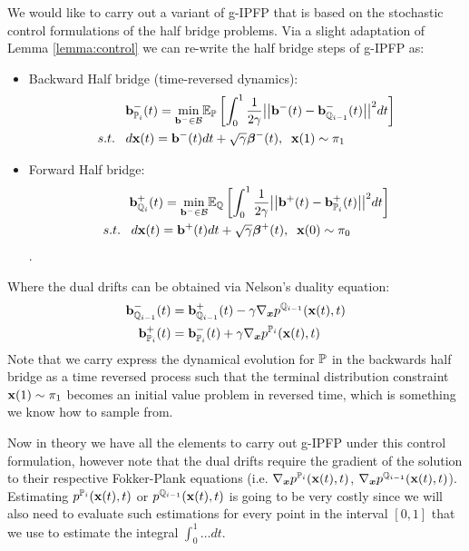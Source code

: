 \documentclass[a4paper,12pt,twoside,openright]{report}
\theoremstyle{definition}
\begin{document}
We would like to carry out a variant of g-IPFP that is based on the stochastic control formulations of the half bridge problems. Via a slight adaptation of Lemma \ref{lemma:control} we can re-write the half bridge steps of g-IPFP as:
\begin{itemize}
\item Backward Half bridge (time-reversed dynamics): 
\begin{align} \label{eq:controlled_haalf_bridge_forward}
  \rvb^{-}_{\P_{i}}(t) = \min_{\rvb^{-} \in \calB }  &\E_\P\left[\int_0^1 \frac{1}{2\gamma}\big|\big|\rvb^{-}(t) -\rvb^{-}_{\Q_{i-1}}(t) \big|\big|^2 dt\right] \nonumber \\
    s.t.\;\;\; d\rvx(t) = \rvb^{-}(t) &dt + \sqrt{\gamma} \rvw^{-}(t), \;\; \rvx(1) \sim \pi_1
\end{align}
\item Forward Half bridge:
\begin{align} \label{eq:controlled_half_bridge_backward}
   \rvb^{+}_{\Q_{i}}(t) =\min_{\rvb^{-} \in \calB } & \E_\Q\left[\int_0^1 \frac{1}{2\gamma}\big|\big|\rvb^{+}(t) -\rvb^{+}_{\P_{i}}(t)\big|\big|^2 dt\right] \nonumber \\
    s.t.\;\;\; d\rvx(t) = \rvb^{+}(t) &dt + \sqrt{\gamma} \rvw^{+}(t), \;\; \rvx(0) \sim \pi_0
\end{align}.
\end{itemize}
Where the dual drifts can be obtained via Nelson's duality equation:
\begin{align*}
      \rvb^{-}_{\Q_{i-1}}(t)   &=\rvb^{+}_{\Q_{i-1}}(t) -\gamma\nabla_{\vx} p^{\Q_{i-1}}(\rvx(t), t) \\
    \rvb^{+}_{\P_{i}}(t) &=  \rvb^{-}_{\P_{i}}(t) +\gamma\nabla_{\vx} p^{\P_{i}}(\rvx(t), t)
\end{align*}
Note that we carry express the dynamical evolution for $\P$ in the backwards half bridge as a time reversed process \citep{pavon1991free, nelson1967dynamical} such that the terminal distribution constraint $\rvx(1) \sim \pi_1$ becomes an initial value problem in reversed time, which is something we know how to sample from. 

Now in theory we have all the elements to carry out g-IPFP under this control formulation, however note that the dual drifts require the gradient of the solution to their respective Fokker-Plank equations (i.e. $\nabla_{\vx} p^{\P_{i}}(\rvx(t), t)$, $\nabla_{\vx} p^{\Q_{i-1}}(\rvx(t), t)$). Estimating $p^{\P_{i}}(\rvx(t), t)$ or $p^{\Q_{i-1}}(\rvx(t), t)$ is going to be very costly since we  will also need to evaluate such estimations for every point in the interval $[0,1]$ that we use to estimate the integral $\int_0^1 \hdots dt$.
\end{document}
